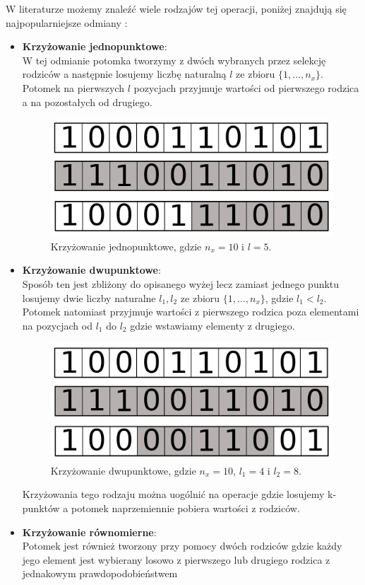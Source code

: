 \documentclass{article}
\begin{document}
W literaturze możemy znaleźć wiele rodzajów tej operacji, poniżej znajdują się najpopularniejsze
odmiany \cite{goldberg}:
\begin{itemize}
\item \textbf{Krzyżowanie jednopunktowe}:\\
W tej odmianie potomka tworzymy z dwóch wybranych przez selekcję rodziców a następnie 
losujemy liczbę naturalną  $l$ ze zbioru $\{1,\ldots, n_x\}$.
Potomek na pierwszych $l$ pozycjach przyjmuje wartości od pierwszego rodzica
a na pozostałych od drugiego.
\begin{figure}[H]
\centering
\includegraphics[scale=0.2]{crossover_v2.png}
\caption{Krzyżowanie jednopunktowe, gdzie $n_x = 10$ i $l = 5$.}
\end{figure}

\item \textbf{Krzyżowanie dwupunktowe}:\\
Sposób ten jest zbliżony do opisanego wyżej lecz zamiast jednego punktu losujemy dwie liczby
naturalne $l_1, l_2$ ze zbioru $\{1,\ldots, n_x\}$, gdzie $l_1 < l_2$.
Potomek natomiast przyjmuje wartości z pierwszego rodzica poza elementami na pozycjach od
$l_1$ do $l_2$ gdzie wstawiamy elementy z drugiego.

\begin{figure}[H]
\centering
\includegraphics[scale=0.2]{two_crossover_v2.png}
\caption{Krzyżowanie dwupunktowe, gdzie $n_x = 10$, $l_1 = 4$ i $l_2 = 8$.}
\end{figure}

Krzyżowania tego rodzaju można uogólnić na operacje gdzie losujemy k-punktów
a potomek naprzemiennie pobiera wartości z rodziców.\\
\item \textbf{Krzyżowanie równomierne}:\\
Potomek jest również tworzony przy pomocy dwóch rodziców gdzie każdy jego element jest
wybierany losowo z pierwszego lub drugiego rodzica z jednakowym prawdopodobieństwem 

\end{itemize}
\end{document}
